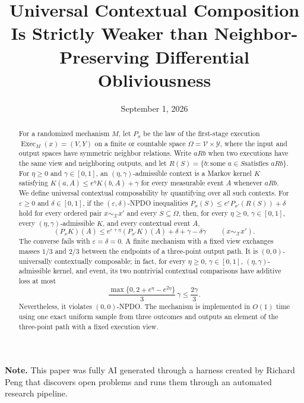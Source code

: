 \documentclass[11pt]{article}
\title{Universal Contextual Composition Is Strictly Weaker than
Neighbor-Preserving Differential Obliviousness}
\author{}
\date{September 1, 2026}
\begin{document}

\maketitle

\begin{abstract}
For a randomized mechanism $M$, let $P_x$ be the law of the first-stage execution
$\operatorname{Exec}_M(x)=(V,Y)$ on a finite or countable space
$\Omega=\mathcal V\times\mathcal Y$, where the input and output spaces have
symmetric neighbor relations.  Write $aRb$ when two executions have the same
view and neighboring outputs, and let $R(S)=\{b:\text{some }a\in S\text{
 satisfies }aRb\}$.  For $\eta\geq0$ and $\gamma\in[0,1]$, an
$(\eta,\gamma)$-admissible context is a Markov kernel $K$ satisfying
$K(a,A)\leq e^\eta K(b,A)+\gamma$ for every measurable event $A$ whenever
$aRb$.  We define universal
contextual composability by quantifying over all such contexts.  For
$\varepsilon\geq0$ and $\delta\in[0,1]$, if the
$(\varepsilon,\delta)$-NPDO inequalities
$P_x(S)\leq e^\varepsilon P_{x'}(R(S))+\delta$ hold for every ordered pair
$x\sim_{\mathcal X}x'$ and every $S\subseteq\Omega$, then, for every
$\eta\geq0$, $\gamma\in[0,1]$, every $(\eta,\gamma)$-admissible $K$, and
every contextual event $A$,
\[
 (P_xK)(A)
 \leq e^{\varepsilon+\eta}(P_{x'}K)(A)
      +\delta+\gamma-\delta\gamma
 \qquad (x\sim_{\mathcal X}x').
\]
The converse fails with $\varepsilon=\delta=0$.  A finite mechanism with a
fixed view exchanges masses $1/3$ and $2/3$ between the endpoints of a
three-point output path.  It is $(0,0)$-universally contextually composable;
in fact,
for every $\eta\geq0$, $\gamma\in[0,1]$, $(\eta,\gamma)$-admissible kernel,
and event, its two nontrivial contextual comparisons have additive loss at most
\[
 \frac{\max\{0,2+e^\eta-e^{2\eta}\}}{3}\,\gamma
 \leq \frac{2\gamma}{3}.
\]
Nevertheless, it violates $(0,0)$-NPDO.  The mechanism is implemented in
$O(1)$ time using one exact uniform sample from three outcomes and outputs an
element of the three-point path with a fixed execution view.
\end{abstract}

\noindent\textbf{Note.} This paper was fully AI generated through a harness created by Richard Peng that discovers open problems and runs them through an automated research pipeline.\par

\clearpage
\tableofcontents
\clearpage

\end{document}
